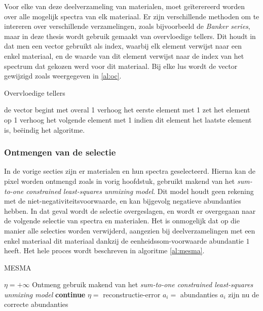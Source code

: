 \documentclass[12pt]{report}
\begin{document}
Voor elke van deze deelverzameling van materialen, moet ge\"iterereerd worden over alle mogelijk spectra van elk materiaal. Er zijn verschillende methoden om te intereren over verschillende verzamelingen, zoals bijvoorbeeld de \textit{Banker series}, maar in deze thesis wordt gebruik gemaakt van overvloedige tellers\citep{mesma}. Dit houdt in dat men een vector gebruikt als index, waarbij elk element verwijst naar een enkel materiaal, en de waarde van dit element verwijst naar de index van het spectrum dat gekozen werd voor dit materiaal. Bij elke lus wordt de vector gewijzigd zoals weergegeven in \ref{al:oc}.

\begin{algorithm}
\caption{Overvloedige tellers\label{al:oc}}
\begin{algorithmic}[1]
\State de vector begint met overal 1
\State verhoog het eerste element met 1
\State zet het element op 1
\State verhoog het volgende element met 1
\State indien dit element het laatste element is, be\"eindig het algoritme.
\EndIf
\EndFor
\EndWhile
\end{algorithmic}
\end{algorithm}


\subsubsection{Ontmengen van de selectie}

In de vorige secties zijn er materialen en hun spectra geselecteerd. Hierna kan de pixel worden ontmengd zoals in vorig hoofdstuk, gebruikt makend van het \textit{sum-to-one constrained least-squares unmixing model}. Dit model houdt geen rekening met de niet-negativiteitsvoorwaarde, en kan bijgevolg negatieve abundanties hebben. In dat geval wordt de selectie overgeslagen, en wordt er overgegaan naar de volgende selectie van spectra en materialen. Het is onmogelijk dat op die manier alle selecties worden verwijderd, aangezien bij deelverzamelingen met een enkel materiaal dit materiaal dankzij de eenheidssom-voorwaarde abundantie $1$ heeft. Het hele proces wordt beschreven in algoritme \ref{al:mesma}.

\begin{algorithm}
\caption{MESMA\label{al:mesma}}
\begin{algorithmic}[1]
\State $\eta = +\infty$ 
\State Ontmeng gebruik makend van het \textit{sum-to-one constrained least-squares unmixing model}
\State \textbf{continue}
\EndIf
{}
\State $\eta = $ reconstructie-error
\State $a_i = $ abundanties
\EndIf
\EndFor
\EndFor
\State $a_i$ zijn nu de correcte abundanties
\end{algorithmic}
\end{algorithm}
\end{document}
